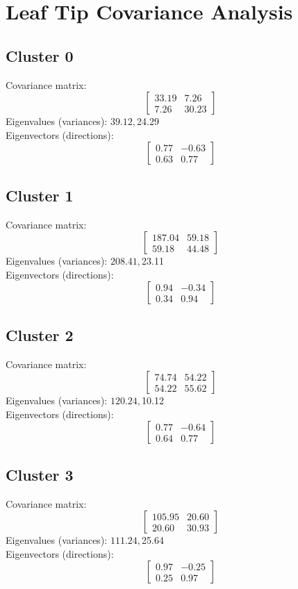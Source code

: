 \documentclass{article}
\begin{document}
\section*{Leaf Tip Covariance Analysis}
\subsection*{Cluster 0}
Covariance matrix:
\[\begin{bmatrix}33.19 & 7.26 \\7.26 & 30.23\end{bmatrix}\]
Eigenvalues (variances): $ 39.12, $24.29\\
Eigenvectors (directions):
\[\begin{bmatrix}0.77 & -0.63 \\0.63 & 0.77\end{bmatrix}\]
\subsection*{Cluster 1}
Covariance matrix:
\[\begin{bmatrix}187.04 & 59.18 \\59.18 & 44.48\end{bmatrix}\]
Eigenvalues (variances): $ 208.41, $23.11\\
Eigenvectors (directions):
\[\begin{bmatrix}0.94 & -0.34 \\0.34 & 0.94\end{bmatrix}\]
\subsection*{Cluster 2}
Covariance matrix:
\[\begin{bmatrix}74.74 & 54.22 \\54.22 & 55.62\end{bmatrix}\]
Eigenvalues (variances): $ 120.24, $10.12\\
Eigenvectors (directions):
\[\begin{bmatrix}0.77 & -0.64 \\0.64 & 0.77\end{bmatrix}\]
\subsection*{Cluster 3}
Covariance matrix:
\[\begin{bmatrix}105.95 & 20.60 \\20.60 & 30.93\end{bmatrix}\]
Eigenvalues (variances): $ 111.24, $25.64\\
Eigenvectors (directions):
\[\begin{bmatrix}0.97 & -0.25 \\0.25 & 0.97\end{bmatrix}\]
\end{document}
